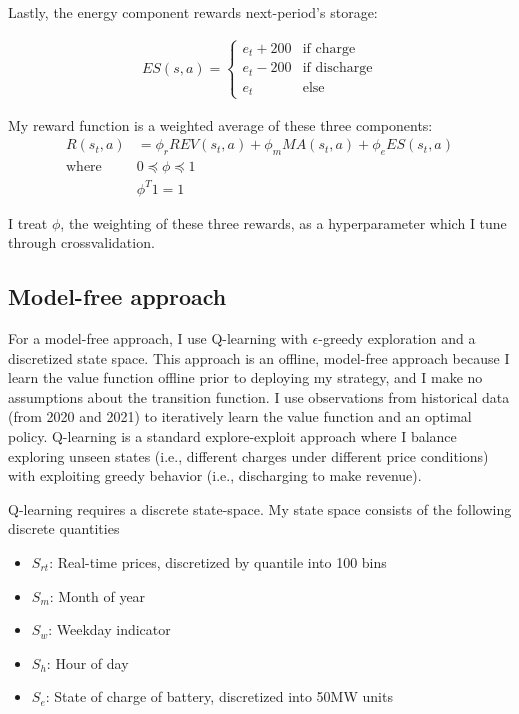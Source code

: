 \documentclass[conference]{IEEEtran}
\begin{document}
Lastly, the energy component rewards next-period's storage:

\begin{align}
    ES(s, a) = \begin{cases}
        e_t + 200 & \textrm{if charge}\\
        e_t - 200 & \textrm{if discharge}\\
        e_t & \textrm{else}
    \end{cases}
\end{align}

My reward function is a weighted average of these three components:
\begin{align*}
    R(s_t, a) &= \phi_r REV(s_t, a) + \phi_m MA(s_t, a) + \phi_e ES(s_t, a)\\
    \textrm{where } & 0 \preceq \phi \preceq 1\\
    & \phi^T 1 = 1
\end{align*}

I treat $\phi$, the weighting of these three rewards, as a hyperparameter which I tune through crossvalidation.

\subsection{Model-free approach}
For a model-free approach, I use Q-learning with $\epsilon$-greedy exploration and a discretized state space. This approach is an offline, model-free approach because I learn the value function offline prior to deploying my strategy, and I make no assumptions about the transition function. I use observations from historical data (from 2020 and 2021) to iteratively learn the value function and an optimal policy. Q-learning is a standard explore-exploit approach where I balance exploring unseen states (i.e., different charges under different price conditions) with exploiting greedy behavior (i.e., discharging to make revenue).

Q-learning requires a discrete state-space. My state space consists of the following discrete quantities
\begin{itemize}
    \item $S_{rt}$: Real-time prices, discretized by quantile into 100 bins
    \item $S_{m}$: Month of year
    \item $S_{w}$: Weekday indicator
    \item $S_{h}$: Hour of day
    \item $S_{e}$: State of charge of battery, discretized into 50MW units
\end{itemize}
\end{document}
